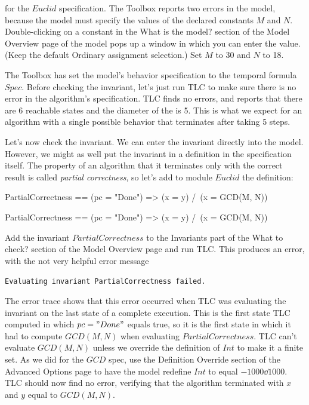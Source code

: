 \documentclass[fleqn,leqno]{article}
\begin{document}
 for the $Euclid$
specification.  The Toolbox reports two errors in the model, because 
the model must specify the values of the declared constants $M$ and $N$.
Double-clicking on a constant in the \textsf{What is the model?} section
of the \textsf{Model Overview} page of the model pops up a window in
which you can enter the value.  (Keep the default \textsf{Ordinary assignment}
selection.)  Set $M$ to 30 and $N$ to 18.

The Toolbox has set the model's behavior specification to the temporal
formula $Spec$.  Before checking the invariant, let's just run TLC to
make sure there is no error in the algorithm's specification.  TLC
finds no errors, and reports that there are 6 reachable states and the
diameter of the  is 5.  This is what
we expect for an algorithm with a single possible behavior that
terminates after taking 5 steps.

Let's now check the invariant.  We can enter the invariant directly into
the model.  However, we might as well put the invariant in a definition
in the specification itself.  The property of an algorithm that it
terminates only with the correct result is called 
\emph{partial correctness}, so let's add to module $Euclid$ the definition:
\begin{twocols}[.485]
\begin{notla}
PartialCorrectness ==
  (pc = "Done") => (x = y) /\ (x = GCD(M, N))
\end{notla}
\begin{tlatex}
%
\end{tlatex}
\midcol
\begin{verbatim*}
PartialCorrectness ==
  (pc = "Done") => (x = y) /\ (x = GCD(M, N))
\end{verbatim*}
\end{twocols}
Add the invariant $PartialCorrectness$ to the \textsf{Invariants} part
of the \textsf{What to check?} section of the \textsf{Model Overview}
page and run TLC\@.  This produces an error, with the not very helpful
error message
\begin{display}
\texttt{Evaluating invariant PartialCorrectness failed.}
\end{display}
The error trace shows that this error occurred when TLC was evaluating
the invariant on the last state of a complete execution.  This
is the first state TLC computed in which $pc="Done"$ equals true,
so it is the first state in which it had to compute $GCD(M,N)$ when
evaluating $PartialCorrectness$.  TLC can't evaluate $GCD(M,N)$ unless
we override the definition of $Int$ to make it a finite set.  As we did
for the $GCD$ spec, use the \textsf{Definition Override} section of
the \textsf{Advanced Options} page to have the model redefine $Int$
to equal $-1000\dd 1000$.  TLC should now find no error, verifying that
the algorithm terminated with $x$ and $y$ equal to $GCD(M,N)$.
\end{document}
